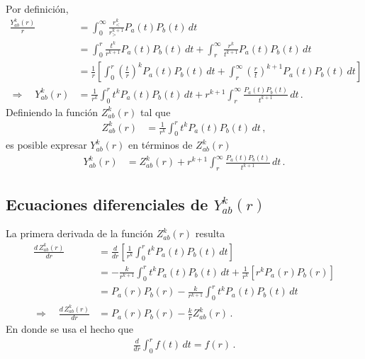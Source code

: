 \documentclass[11pt]{article}
\begin{document}
Por definición,
\begin{align}
 \frac{Y_{ab}^k(r) }{r}
 &= \int_0^{\infty} \frac{r_<^k}{r_>^{k+1}}P_a(t)P_b(t)\,dt \\
 &= \int_0^r \frac{t^k}{r^{k+1}} P_a(t)P_b(t)\,dt 
  + \int_r^{\infty} \frac{r^k}{t^{k+1}} P_a(t)P_b(t)\,dt \\
 &=\frac{1}{r} \left[ \int_0^r \left(\frac{t}{r}\right)^k P_a(t)P_b(t)\,dt
  + \int_r^{\infty} \left(\frac{r}{t}\right)^{k+1} P_a(t)P_b(t)\,dt \right]\\
 \Rightarrow\quad Y_{ab}^k(r) &= \frac{1}{r^k} \int_0^r t^k P_a(t)P_b(t)\,dt
  + r^{k+1} \int_r^{\infty} \frac{P_a(t)P_b(t)}{t^{k+1}}\,dt \,.
\end{align}
Definiendo la función $Z_{ab}^k(r)$ tal que
\begin{align}
 Z_{ab}^k(r) &= \frac{1}{r^k} \int_0^r t^k P_a(t)P_b(t)\,dt\,,
\label{eq:Zabk}
\end{align}
es posible expresar $Y_{ab}^k(r)$ en términos de $Z_{ab}^k(r)$
\begin{align}
 Y_{ab}^k(r) &= Z_{ab}^k(r) 
 + r^{k+1} \int_r^{\infty} \frac{P_a(t)P_b(t)}{t^{k+1}}\,dt \,.
\label{eq:Yabk}
\end{align}

\subsection{Ecuaciones diferenciales de $Y_{ab}^k(r)$}

La primera derivada de la función $Z_{ab}^k(r)$ resulta
\begin{align}
 \frac{d\,Z_{ab}^k(r)}{dr} 
 &= \frac{d}{dr} \left[ \frac{1}{r^k} \int_0^r t^k P_a(t)P_b(t)\,dt \right] \\
 &= -\frac{k}{r^{k+1}}\int_0^r t^k P_a(t)P_b(t)\,dt + \frac{1}{r^k} \left[ r^k P_a(r)P_b(r) \right] \\
 &= P_a(r)P_b(r) -\frac{k}{r^{k+1}}\int_0^r t^k P_a(t)P_b(t)\,dt \\
 \Rightarrow\quad \frac{d\,Z_{ab}^k(r)}{dr} &= P_a(r)P_b(r) - \frac{k}{r} Z_{ab}^k(r)  \,.
 \label{eq:dZkab_A}
\end{align}
En donde se usa el hecho que
\begin{align}
 \frac{d}{dr} \int_0^r f(t)\,dt = f(r)\,.
\end{align}
\end{document}
